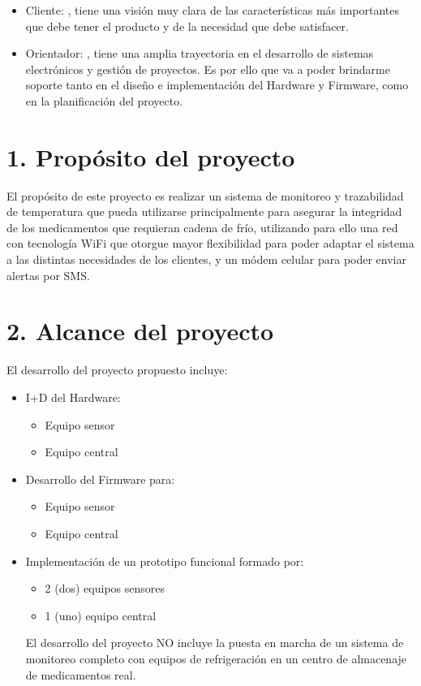 \documentclass[11pt]{charter}
\begin{document}
 
\begin{itemize}
\item Cliente: \clientename, tiene una visión muy clara de las características más importantes que debe tener el producto y de la necesidad que debe satisfacer. 
\item Orientador: \supname, tiene una amplia trayectoria en el desarrollo de sistemas electrónicos y gestión de proyectos. Es por ello que va a poder brindarme soporte tanto en el diseño e implementación del Hardware y Firmware, como en la planificación del proyecto.
\end{itemize}




\section{1. Propósito del proyecto}
\label{sec:proposito}

El propósito de este proyecto es realizar un sistema de monitoreo y trazabilidad de temperatura que pueda utilizarse principalmente para asegurar la integridad de los medicamentos que requieran cadena de frío, utilizando para ello una red con tecnología WiFi que otorgue mayor flexibilidad para poder adaptar el sistema a las distintas necesidades de los clientes, y un módem celular para poder enviar alertas por SMS.


\section{2. Alcance del proyecto}
\label{sec:alcance}

El desarrollo del proyecto propuesto incluye:
\begin{itemize}
    \item I+D del Hardware:
        \begin{itemize}
            \item Equipo sensor
            \item Equipo central
        \end{itemize}
    \item Desarrollo del Firmware para:
        \begin{itemize}
            \item Equipo sensor
            \item Equipo central
        \end{itemize}
    \item Implementación de un prototipo funcional formado por:
        \begin{itemize}
            \item 2 (dos) equipos sensores
            \item 1 (uno) equipo central
        \end{itemize}

El desarrollo del proyecto NO incluye la puesta en marcha de un sistema de monitoreo completo con equipos de refrigeración en un centro de almacenaje de medicamentos real.
\end{itemize}
\end{document}
